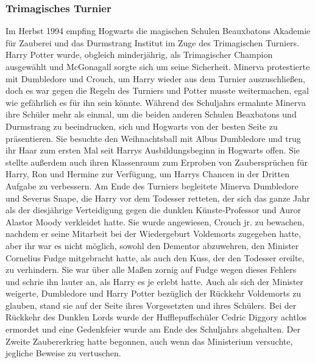 \documentclass[a4paper, 10pt]{article}
\begin{document}
\subsubsection*{\large Trimagisches Turnier}
Im Herbst 1994 empfing Hogwarts die magischen Schulen Beauxbatons Akademie für Zauberei und das Durmstrang Institut im Zuge des Trimagischen Turniers. Harry Potter wurde, obgleich minderjährig, als Trimagischer Champion ausgewählt und McGonagall sorgte sich um seine Sicherheit. Minerva protestierte mit Dumbledore und Crouch, um Harry wieder aus dem Turnier auszuschließen, doch es war gegen die Regeln des Turniers und Potter musste weitermachen, egal wie gefährlich es für ihn sein könnte.
\vspace{10pt}
\newline
{}  
Während des Schuljahrs ermahnte Minerva ihre Schüler mehr als einmal, um die beiden anderen Schulen Beaxbatons und Durmstrang zu beeindrucken, sich und Hogwarts von der besten Seite zu präsentieren. Sie besuchte den Weihnachtsball mit Albus Dumbledore und trug ihr Haar zum ersten Mal seit Harrys Ausbildungsbeginn in Hogwarts offen. Sie stellte außerdem auch ihren Klassenraum zum Erproben von Zaubersprüchen für Harry, Ron und Hermine zur Verfügung, um Harrys Chancen in der Dritten Aufgabe zu verbessern. Am Ende des Turniers begleitete Minerva Dumbledore und Severus Snape, die Harry vor dem Todesser retteten, der sich das ganze Jahr als der diesjährige Verteidigung gegen die dunklen Künste-Professor und Auror Alastor Moody verkleidet hatte.
\vspace{10pt}
\newline
{}  
Sie wurde angewiesen, Crouch jr. zu bewachen, nachdem er seine Mitarbeit bei der Wiedergeburt Voldemorts zugegeben hatte, aber ihr war es nicht möglich, sowohl den Dementor abzuwehren, den Minister Cornelius Fudge mitgebracht hatte, als auch den Kuss, der den Todesser ereilte, zu verhindern. Sie war über alle Maßen zornig auf Fudge wegen dieses Fehlers und schrie ihn lauter an, als Harry es je erlebt hatte. Auch als sich der Minister weigerte, Dumbledore und Harry Potter bezüglich der Rückkehr Voldemorts zu glauben, stand sie auf der Seite ihres Vorgesetzten und ihres Schülers. Bei der Rückkehr des Dunklen Lords wurde der Hufflepuffschüler Cedric Diggory achtlos ermordet und eine Gedenkfeier wurde am Ende des Schuljahrs abgehalten. Der Zweite Zaubererkrieg hatte begonnen, auch wenn das Ministerium versuchte, jegliche Beweise zu vertuschen.
\end{document}
